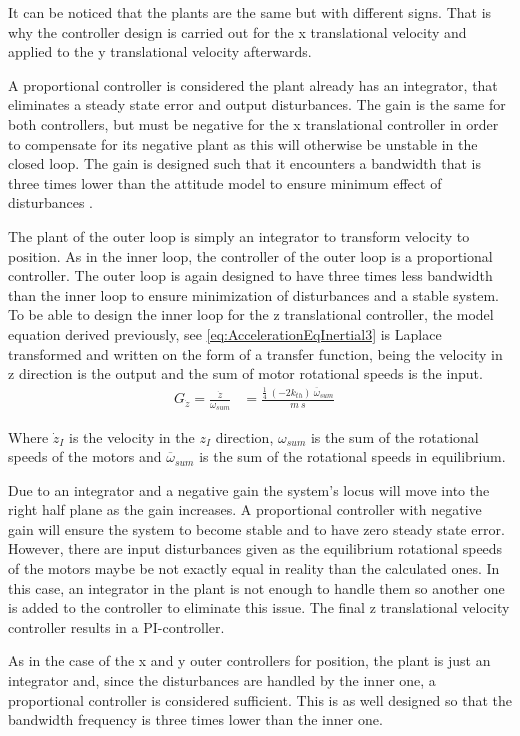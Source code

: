 It can be noticed that the plants are the same but with different signs. That is why the controller design is carried out for the x translational velocity and applied to the y translational velocity afterwards.

A proportional controller is considered the plant already has an integrator, that eliminates a steady state error and output disturbances. The gain is the same for both controllers, but must be negative for the x translational controller in order to compensate for its negative plant as this will otherwise be unstable in the closed loop. The gain is designed such that it encounters a bandwidth that is three times lower than the attitude model to ensure minimum effect of disturbances \cite{bandwidthReference}.

The plant of the outer loop is simply an integrator to transform velocity to position. As in the inner loop, the controller of the outer loop is a proportional controller. The outer loop is again designed to have three times less bandwidth than the inner loop to ensure minimization of disturbances and a stable system.\\

To be able to design the inner loop for the z translational controller, the model equation derived previously, see \autoref{eq:AccelerationEqInertial3} is Laplace transformed and written on the form of a transfer function, being the velocity in z direction is the output and the sum of motor rotational speeds is the input.
%
\begin{align}
G_{\dot{z}}=\frac{\dot{z}}{\omega_{sum}} &= \frac{ \frac{1}{4}\ (-2 k_{th})\ \overline{\omega}_{sum} }{ m\ s } & \label{eq:linearTransferFunctionZ}
\end{align}

Where $\dot{z}_I$ is the velocity in the $z_I$ direction, $\omega_{sum}$ is the sum of the rotational speeds of the motors and $\overline{\omega}_{sum}$ is the sum of the rotational speeds in equilibrium.

Due to an integrator and a negative gain the system's locus will move into the right half plane as the gain increases. A proportional controller with negative gain will ensure the system to become stable and to have zero steady state error. However, there are input disturbances given as the equilibrium rotational speeds of the motors maybe be not exactly equal in reality than the calculated ones. In this case, an integrator in the plant is not enough to handle them so another one is added to the controller to eliminate this issue. The final z translational velocity controller results in a  PI-controller. 

As in the case of the x and y outer controllers for position, the plant is just an integrator and, since the disturbances are handled by the inner one, a proportional controller is considered sufficient. This is as well designed so that the bandwidth frequency is three times lower than the inner one.
